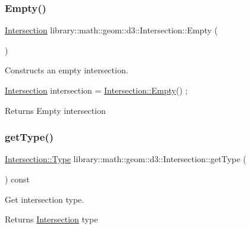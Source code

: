 \subsubsection{\texorpdfstring{Empty()}{Empty()}}
{\footnotesize\ttfamily \hyperlink{classlibrary_1_1math_1_1geom_1_1d3_1_1_intersection}{Intersection} library\+::math\+::geom\+::d3\+::\+Intersection\+::\+Empty (\begin{DoxyParamCaption}{ }\end{DoxyParamCaption})\hspace{0.3cm}{\ttfamily [static]}}



Constructs an empty intersection. 


\begin{DoxyCode}
\hyperlink{classlibrary_1_1math_1_1geom_1_1d3_1_1_intersection_ab800dbab95076a1d7ae47bd9d0887da3}{Intersection} intersection = \hyperlink{classlibrary_1_1math_1_1geom_1_1d3_1_1_intersection_af0f1aed5c97a5142a4b20cb8edcb78e0}{Intersection::Empty}() ;
\end{DoxyCode}


\begin{DoxyReturn}{Returns}
Empty intersection 
\end{DoxyReturn}
\mbox{\label{classlibrary_1_1math_1_1geom_1_1d3_1_1_intersection_aead6925dc35a2f6aec30373ca1556600}} 
\subsubsection{\texorpdfstring{get\+Type()}{getType()}}
{\footnotesize\ttfamily \hyperlink{classlibrary_1_1math_1_1geom_1_1d3_1_1_intersection_a3465d607fd42380f350598e055271b05}{Intersection\+::\+Type} library\+::math\+::geom\+::d3\+::\+Intersection\+::get\+Type (\begin{DoxyParamCaption}{ }\end{DoxyParamCaption}) const}



Get intersection type. 

\begin{DoxyReturn}{Returns}
\hyperlink{classlibrary_1_1math_1_1geom_1_1d3_1_1_intersection}{Intersection} type 
\end{DoxyReturn}
\mbox{\label{classlibrary_1_1math_1_1geom_1_1d3_1_1_intersection_a9e7c3d0568a6c9a29ba3503751166932}} 
